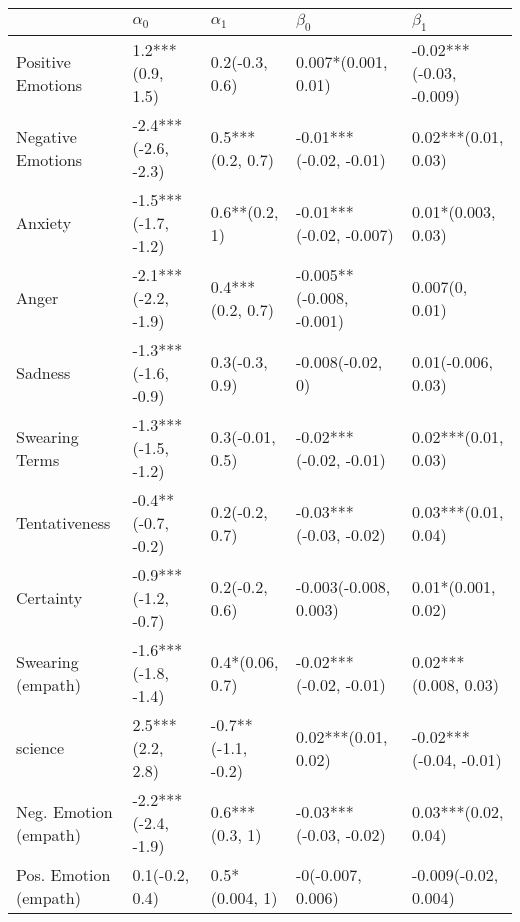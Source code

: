 \begin{tabular}{lllll}
\toprule
{} &           $\alpha_0$ &          $\alpha_1$ &                 $\beta_0$ &                $\beta_1$ \\
\midrule
Positive Emotions     &     1.2***(0.9, 1.5) &      0.2(-0.3, 0.6) &       0.007*(0.001, 0.01) &  -0.02***(-0.03, -0.009) \\
Negative Emotions     &  -2.4***(-2.6, -2.3) &    0.5***(0.2, 0.7) &    -0.01***(-0.02, -0.01) &      0.02***(0.01, 0.03) \\
Anxiety               &  -1.5***(-1.7, -1.2) &       0.6**(0.2, 1) &   -0.01***(-0.02, -0.007) &       0.01*(0.003, 0.03) \\
Anger                 &  -2.1***(-2.2, -1.9) &    0.4***(0.2, 0.7) &  -0.005**(-0.008, -0.001) &           0.007(0, 0.01) \\
Sadness               &  -1.3***(-1.6, -0.9) &      0.3(-0.3, 0.9) &          -0.008(-0.02, 0) &       0.01(-0.006, 0.03) \\
Swearing Terms        &  -1.3***(-1.5, -1.2) &     0.3(-0.01, 0.5) &    -0.02***(-0.02, -0.01) &      0.02***(0.01, 0.03) \\
Tentativeness         &   -0.4**(-0.7, -0.2) &      0.2(-0.2, 0.7) &    -0.03***(-0.03, -0.02) &      0.03***(0.01, 0.04) \\
Certainty             &  -0.9***(-1.2, -0.7) &      0.2(-0.2, 0.6) &     -0.003(-0.008, 0.003) &       0.01*(0.001, 0.02) \\
Swearing (empath)     &  -1.6***(-1.8, -1.4) &     0.4*(0.06, 0.7) &    -0.02***(-0.02, -0.01) &     0.02***(0.008, 0.03) \\
science               &     2.5***(2.2, 2.8) &  -0.7**(-1.1, -0.2) &       0.02***(0.01, 0.02) &   -0.02***(-0.04, -0.01) \\
Neg. Emotion (empath) &  -2.2***(-2.4, -1.9) &      0.6***(0.3, 1) &    -0.03***(-0.03, -0.02) &      0.03***(0.02, 0.04) \\
Pos. Emotion (empath) &       0.1(-0.2, 0.4) &      0.5*(0.004, 1) &         -0(-0.007, 0.006) &     -0.009(-0.02, 0.004) \\
\bottomrule
\end{tabular}

